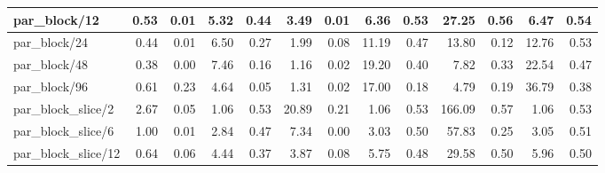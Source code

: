 \begin{tabular}{|lllllllllllll|}
\multicolumn{1}{|l|}{par\_block/12}  & \multicolumn{1}{r|}{0.53} & \multicolumn{1}{r|}{0.01} & \multicolumn{1}{r|}{5.32} & \multicolumn{1}{r|}{0.44}  & \multicolumn{1}{r|}{3.49} & \multicolumn{1}{r|}{0.01} & \multicolumn{1}{r|}{6.36} & \multicolumn{1}{r|}{0.53}  & \multicolumn{1}{r|}{27.25} & \multicolumn{1}{r|}{0.56} & \multicolumn{1}{r|}{6.47} & \multicolumn{1}{r|}{0.54}  \\ \hline
\multicolumn{1}{|l|}{par\_block/24}  & \multicolumn{1}{r|}{0.44} & \multicolumn{1}{r|}{0.01} & \multicolumn{1}{r|}{6.50} & \multicolumn{1}{r|}{0.27}  & \multicolumn{1}{r|}{1.99} & \multicolumn{1}{r|}{0.08} & \multicolumn{1}{r|}{11.19} & \multicolumn{1}{r|}{0.47}  & \multicolumn{1}{r|}{13.80} & \multicolumn{1}{r|}{0.12} & \multicolumn{1}{r|}{12.76} & \multicolumn{1}{r|}{0.53}  \\ \hline
\multicolumn{1}{|l|}{par\_block/48}  & \multicolumn{1}{r|}{0.38} & \multicolumn{1}{r|}{0.00} & \multicolumn{1}{r|}{7.46} & \multicolumn{1}{r|}{0.16}  & \multicolumn{1}{r|}{1.16} & \multicolumn{1}{r|}{0.02} & \multicolumn{1}{r|}{19.20} & \multicolumn{1}{r|}{0.40}  & \multicolumn{1}{r|}{7.82} & \multicolumn{1}{r|}{0.33} & \multicolumn{1}{r|}{22.54} & \multicolumn{1}{r|}{0.47}  \\ \hline
\multicolumn{1}{|l|}{par\_block/96}  & \multicolumn{1}{r|}{0.61} & \multicolumn{1}{r|}{0.23} & \multicolumn{1}{r|}{4.64} & \multicolumn{1}{r|}{0.05}  & \multicolumn{1}{r|}{1.31} & \multicolumn{1}{r|}{0.02} & \multicolumn{1}{r|}{17.00} & \multicolumn{1}{r|}{0.18}  & \multicolumn{1}{r|}{4.79} & \multicolumn{1}{r|}{0.19} & \multicolumn{1}{r|}{36.79} & \multicolumn{1}{r|}{0.38}  \\ \hline
\multicolumn{1}{|l|}{par\_block\_slice/2}  & \multicolumn{1}{r|}{2.67} & \multicolumn{1}{r|}{0.05} & \multicolumn{1}{r|}{1.06} & \multicolumn{1}{r|}{0.53}  & \multicolumn{1}{r|}{20.89} & \multicolumn{1}{r|}{0.21} & \multicolumn{1}{r|}{1.06} & \multicolumn{1}{r|}{0.53}  & \multicolumn{1}{r|}{166.09} & \multicolumn{1}{r|}{0.57} & \multicolumn{1}{r|}{1.06} & \multicolumn{1}{r|}{0.53}  \\ \hline
\multicolumn{1}{|l|}{par\_block\_slice/6}  & \multicolumn{1}{r|}{1.00} & \multicolumn{1}{r|}{0.01} & \multicolumn{1}{r|}{2.84} & \multicolumn{1}{r|}{0.47}  & \multicolumn{1}{r|}{7.34} & \multicolumn{1}{r|}{0.00} & \multicolumn{1}{r|}{3.03} & \multicolumn{1}{r|}{0.50}  & \multicolumn{1}{r|}{57.83} & \multicolumn{1}{r|}{0.25} & \multicolumn{1}{r|}{3.05} & \multicolumn{1}{r|}{0.51}  \\ \hline
\multicolumn{1}{|l|}{par\_block\_slice/12}  & \multicolumn{1}{r|}{0.64} & \multicolumn{1}{r|}{0.06} & \multicolumn{1}{r|}{4.44} & \multicolumn{1}{r|}{0.37}  & \multicolumn{1}{r|}{3.87} & \multicolumn{1}{r|}{0.08} & \multicolumn{1}{r|}{5.75} & \multicolumn{1}{r|}{0.48}  & \multicolumn{1}{r|}{29.58} & \multicolumn{1}{r|}{0.50} & \multicolumn{1}{r|}{5.96} & \multicolumn{1}{r|}{0.50}  \\ \hline

\end{tabular}
